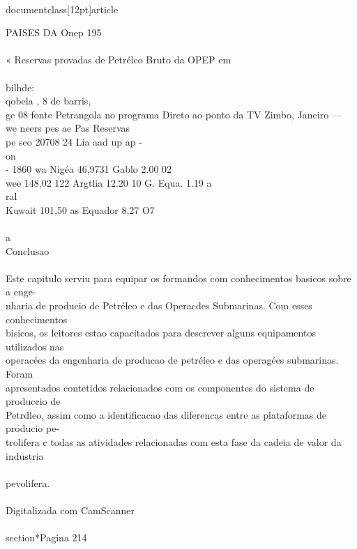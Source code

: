 \\documentclass[12pt]{article}
\begin{document}
PAISES DA Onep 195\\
\\
« Reservas provadas de Petréleo Bruto da OPEP em\\
\\
bilhde:\\
qobela , 8 de barris,\\
ge 08 fonte Petrangola no programa Direto ao ponto da TV Zimbo, Janeiro —\\
we neers pes ae Pas Reservas\\
pe seo 20708 24 Lia aad up ap -\\
on\\
- 1860 wa Nigéa 46,9731 Gablo 2.00 02\\
wee 148,02 122 Argtlia 12.20 10 G. Equa. 1.19 a\\
ral\\
Kuwait 101,50 as Equador 8,27 O7\\
\\
a\\
Conclusao\\
\\
Este capitulo serviu para equipar os formandos com conhecimentos basicos sobre a enge-\\
nharia de producio de Petréleo e das Operacdes Submarinas. Com esses conhecimentos\\
bisicos, os leitores estao capacitados para descrever alguns equipamentos utilizados nas\\
operacées da engenharia de producao de petréleo e das operagées submarinas. Foram\\
apresentados contetidos relacionados com os componentes do sistema de produc¢io de\\
Petrdleo, assim como a identificacao das diferencas entre as plataformas de producio pe-\\
trolifera ¢ todas as atividades relacionadas com esta fase da cadeia de valor da industria\\
\\
pevolifera.\\
\\
Digitalizada com CamScanner\\

\\section*{Pagina 214}
\end{document}
